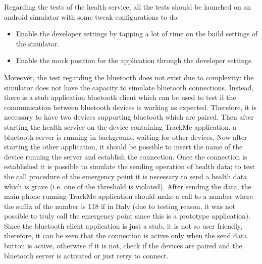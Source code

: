 Regarding the tests of the health service, all the tests should be launched on an android simulator with some tweak configurations to do:
\begin{itemize}
\item Enable the developer settings by tapping a lot of time on the build settings of the simulator.
\item Enable the mock position for the application through the developer settings.
\end{itemize}
Moreover, the test regarding the bluetooth does not exist due to complexity: the simulator does not have the capacity to 
simulate bluetooth connections. Instead, there is a stub application bluetooth client which can be used to test if the 
communication between bluetooth devices is working as expected. Therefore, it is necessary to have two devices 
supporting bluetooth which are paired. Then after starting the health service on the device containing TrackMe application, 
a bluetooth server is running in background waiting for other devices. Now after starting the other application, it should be possible 
to insert the name of the device running the server and establish the connection. Once the connection is established it is possible 
to simulate the sending operation of health data; to test the call procedure of the emergency point it is necessary to send a health 
data which is grave (i.e. one of the threshold is violated). After sending the data, the main phone running TrackMe application 
should make a call to a number where the suffix of the number is 118 if in Italy (due to testing reason, it was not possible to truly 
call the emergency point since this is a prototype application).
Since the bluetooth client application is just a stub, it is not so user friendly, therefore, it can be seen that the connection is active 
only when the send data button is active, otherwise if it is not, check if the devices are paired and the bluetooth server is activated or 
just retry to connect.